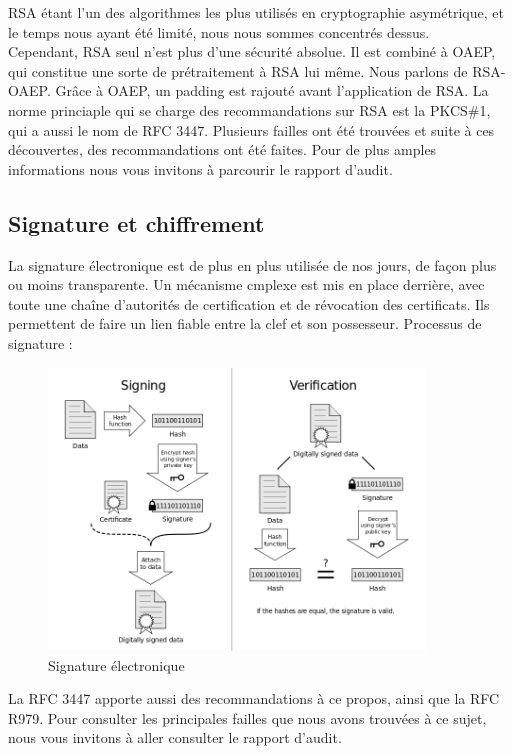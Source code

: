 RSA étant l'un des algorithmes les plus utilisés en cryptographie asymétrique, et le temps nous ayant été limité, nous nous sommes concentrés dessus.\\
Cependant, RSA seul n'est plus d'une sécurité absolue. Il est combiné à OAEP, qui constitue une sorte de prétraitement à RSA lui même. Nous parlons de RSA-OAEP. Grâce à OAEP, un padding est rajouté avant l'application de RSA. La norme princiaple qui se charge des recommandations sur RSA est la PKCS\#1, qui a aussi le nom de RFC 3447.
Plusieurs failles ont été trouvées et suite à ces découvertes, des recommandations ont été faites. Pour de plus amples informations nous vous invitons à parcourir le rapport d'audit.

\subsection{Signature et chiffrement}
La signature électronique est de plus en plus utilisée de nos jours, de façon plus ou moins transparente. Un mécanisme cmplexe est mis en place derrière, avec toute une chaîne d'autorités de certification et de révocation des certificats. Ils permettent de faire un lien fiable entre la clef et son possesseur. Processus de signature : 
\begin{figure}[H]
\begin{center}
\includegraphics[width=10cm]{images/sig_dig.png}
\end{center}
\caption{Signature électronique}
\label{digital sig}
\end{figure}

La RFC 3447 apporte aussi des recommandations à ce propos, ainsi que la RFC R979. Pour consulter les principales failles que nous avons trouvées à ce sujet, nous vous invitons à aller consulter le rapport d'audit.

